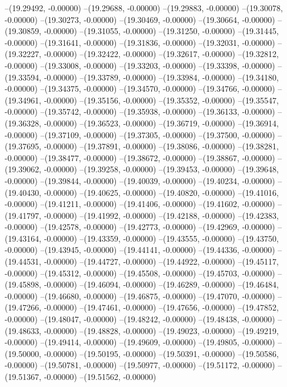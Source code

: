 --(19.29492, -0.00000)
--(19.29688, -0.00000)
--(19.29883, -0.00000)
--(19.30078, -0.00000)
--(19.30273, -0.00000)
--(19.30469, -0.00000)
--(19.30664, -0.00000)
--(19.30859, -0.00000)
--(19.31055, -0.00000)
--(19.31250, -0.00000)
--(19.31445, -0.00000)
--(19.31641, -0.00000)
--(19.31836, -0.00000)
--(19.32031, -0.00000)
--(19.32227, -0.00000)
--(19.32422, -0.00000)
--(19.32617, -0.00000)
--(19.32812, -0.00000)
--(19.33008, -0.00000)
--(19.33203, -0.00000)
--(19.33398, -0.00000)
--(19.33594, -0.00000)
--(19.33789, -0.00000)
--(19.33984, -0.00000)
--(19.34180, -0.00000)
--(19.34375, -0.00000)
--(19.34570, -0.00000)
--(19.34766, -0.00000)
--(19.34961, -0.00000)
--(19.35156, -0.00000)
--(19.35352, -0.00000)
--(19.35547, -0.00000)
--(19.35742, -0.00000)
--(19.35938, -0.00000)
--(19.36133, -0.00000)
--(19.36328, -0.00000)
--(19.36523, -0.00000)
--(19.36719, -0.00000)
--(19.36914, -0.00000)
--(19.37109, -0.00000)
--(19.37305, -0.00000)
--(19.37500, -0.00000)
--(19.37695, -0.00000)
--(19.37891, -0.00000)
--(19.38086, -0.00000)
--(19.38281, -0.00000)
--(19.38477, -0.00000)
--(19.38672, -0.00000)
--(19.38867, -0.00000)
--(19.39062, -0.00000)
--(19.39258, -0.00000)
--(19.39453, -0.00000)
--(19.39648, -0.00000)
--(19.39844, -0.00000)
--(19.40039, -0.00000)
--(19.40234, -0.00000)
--(19.40430, -0.00000)
--(19.40625, -0.00000)
--(19.40820, -0.00000)
--(19.41016, -0.00000)
--(19.41211, -0.00000)
--(19.41406, -0.00000)
--(19.41602, -0.00000)
--(19.41797, -0.00000)
--(19.41992, -0.00000)
--(19.42188, -0.00000)
--(19.42383, -0.00000)
--(19.42578, -0.00000)
--(19.42773, -0.00000)
--(19.42969, -0.00000)
--(19.43164, -0.00000)
--(19.43359, -0.00000)
--(19.43555, -0.00000)
--(19.43750, -0.00000)
--(19.43945, -0.00000)
--(19.44141, -0.00000)
--(19.44336, -0.00000)
--(19.44531, -0.00000)
--(19.44727, -0.00000)
--(19.44922, -0.00000)
--(19.45117, -0.00000)
--(19.45312, -0.00000)
--(19.45508, -0.00000)
--(19.45703, -0.00000)
--(19.45898, -0.00000)
--(19.46094, -0.00000)
--(19.46289, -0.00000)
--(19.46484, -0.00000)
--(19.46680, -0.00000)
--(19.46875, -0.00000)
--(19.47070, -0.00000)
--(19.47266, -0.00000)
--(19.47461, -0.00000)
--(19.47656, -0.00000)
--(19.47852, -0.00000)
--(19.48047, -0.00000)
--(19.48242, -0.00000)
--(19.48438, -0.00000)
--(19.48633, -0.00000)
--(19.48828, -0.00000)
--(19.49023, -0.00000)
--(19.49219, -0.00000)
--(19.49414, -0.00000)
--(19.49609, -0.00000)
--(19.49805, -0.00000)
--(19.50000, -0.00000)
--(19.50195, -0.00000)
--(19.50391, -0.00000)
--(19.50586, -0.00000)
--(19.50781, -0.00000)
--(19.50977, -0.00000)
--(19.51172, -0.00000)
--(19.51367, -0.00000)
--(19.51562, -0.00000)
